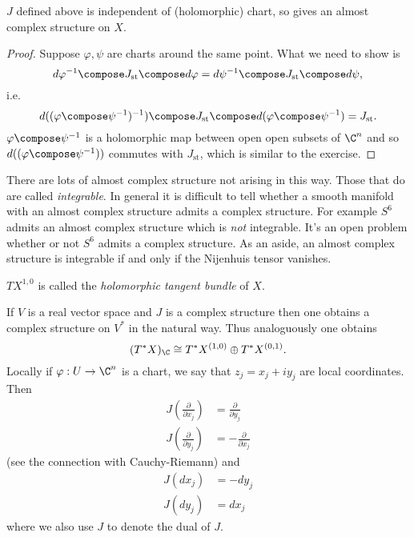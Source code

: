 \documentclass[a4paper]{article}
\begin{document}
\begin{proposition}
  \(J\) defined above is independent of (holomorphic) chart, so gives an almost complex structure on \(X\).
\end{proposition}

\begin{proof}
  Suppose \(\varphi, \psi\) are charts around the same point. What we need to show is
  \[
    d\varphi^{-1} \compose J_{\text{st}} \compose d\varphi = d\psi^{-1} \compose J_{\text{st}} \compose d \psi,
  \]
  i.e.
  \[
    d((\varphi \compose \psi^{-1})^{-1}) \compose J_{\text{st}} \compose d(\varphi \compose \psi^{-1}) = J_{\text{st}}.
  \]
  \(\varphi \compose \psi^{-1}\) is a holomorphic map between open open subsets of \(\C^n\) and so \(d((\varphi \compose \psi^{-1}))\) commutes with \(J_{\text{st}}\), which is similar to the exercise.
\end{proof}

\begin{remark}
  There are lots of almost complex structure not arising in this way. Those that do are called \emph{integrable}. In general it is difficult to tell whether a smooth manifold with an almost complex structure admits a complex structure. For example \(S^6\) admits an almost complex structure which is \emph{not} integrable. It's an open problem whether or not \(S^6\) admits a complex structure. As an aside, an almost complex structure is integrable if and only if the Nijenhuis tensor vanishes.
\end{remark}

\begin{definition}
  \(TX^{1, 0}\) is called the \emph{holomorphic tangent bundle} of \(X\).
\end{definition}

If \(V\) is a real vector space and \(J\) is a complex structure then one obtains a complex structure on \(V^*\) in the natural way. Thus analoguously one obtains
\[
  (T^*X)_\C \cong T^*X^{(1, 0)} \oplus T^*X^{(0, 1)}.
\]
Locally if \(\varphi: U \to \C^n\) is a chart, we say that \(z_j = x_j + iy_j\) are local coordinates. Then
\begin{align*}
  J(\frac{\partial  }{\partial x_j}) &= \frac{\partial  }{\partial y_j} \\
  J(\frac{\partial  }{\partial y_j}) &= - \frac{\partial  }{\partial x_j}
\end{align*}
(see the connection with Cauchy-Riemann) and
\begin{align*}
  J(dx_j) &= -dy_j \\
  J(dy_j) &= dx_j
\end{align*}
where we also use \(J\) to denote the dual of \(J\).
\end{document}
